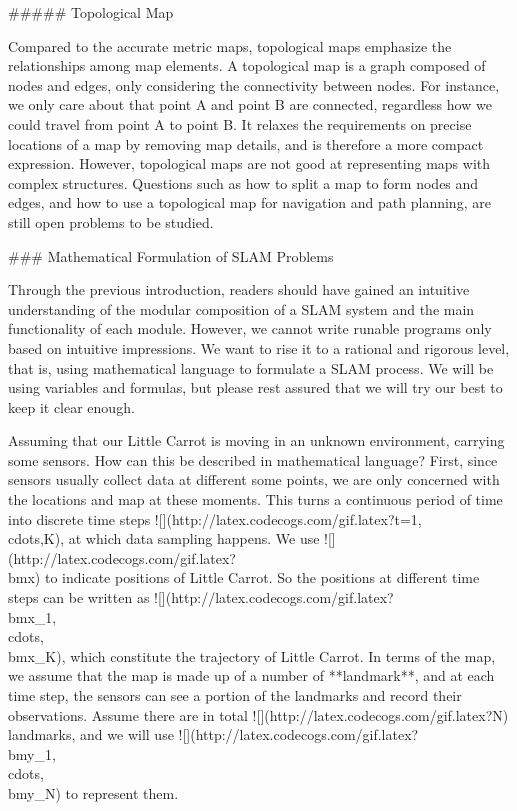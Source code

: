##### Topological Map

Compared to the accurate metric maps, topological maps emphasize the relationships among map elements. A topological map is a graph composed of nodes and edges, only considering the connectivity between nodes. For instance, we only care about that point A and point B are connected, regardless how we could travel from point A to point B. It relaxes the requirements on precise locations of a map by removing map details, and is therefore a more compact expression. However, topological maps are not good at representing maps with complex structures. Questions such as how to split a map to form nodes and edges, and how to use a topological map for navigation and path planning, are still open problems to be studied.

### Mathematical Formulation of SLAM Problems

Through the previous introduction, readers should have gained an intuitive understanding of the modular composition of a SLAM system and the main functionality of each module. However, we cannot write runable programs only based on intuitive impressions. We want to rise it to a rational and rigorous level, that is, using mathematical language to formulate a SLAM process. We will be using variables and formulas, but please rest assured that we will try our best to keep it clear enough.

Assuming that our Little Carrot is moving in an unknown environment, carrying some sensors. How can this be described in mathematical language? First, since sensors usually collect data at different some points, we are only concerned with the locations and map at these moments. This turns a continuous period of time into discrete time steps ![](http://latex.codecogs.com/gif.latex?t=1,\\cdots,K), at which data sampling happens. We use ![](http://latex.codecogs.com/gif.latex?\\bm{x}) to indicate positions of Little Carrot. So the positions at different time steps can be written as ![](http://latex.codecogs.com/gif.latex?\\bm{x}_1,\\cdots,\\bm{x}_K), which constitute the trajectory of Little Carrot. In terms of the map, we assume that the map is made up of a number of **landmark**, and at each time step, the sensors can see a portion of the landmarks and record their observations. Assume there are in total ![](http://latex.codecogs.com/gif.latex?N) landmarks, and we will use ![](http://latex.codecogs.com/gif.latex?\\bm{y}_1,\\cdots,\\bm{y}_N) to represent them.

